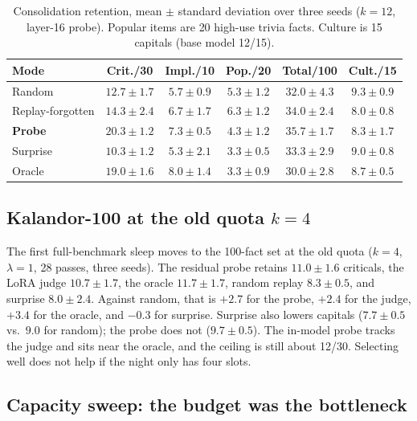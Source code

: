\documentclass[11pt,a4paper]{article}
\begin{document}
\begin{table}[t]
\centering
\caption{Consolidation retention, mean $\pm$ standard deviation over three seeds ($k{=}12$, layer-16 probe). Popular items are 20 high-use trivia facts. Culture is 15 capitals (base model 12/15).}
\label{tab:e5b}
\small
\begin{tabular}{lccccc}
\toprule
Mode & Crit./30 & Impl./10 & Pop./20 & Total/100 & Cult./15 \\
\midrule
Random & $12.7{\pm}1.7$ & $5.7{\pm}0.9$ & $5.3{\pm}1.2$ & $32.0{\pm}4.3$ & $9.3{\pm}0.9$ \\
Replay-forgotten & $14.3{\pm}2.4$ & $6.7{\pm}1.7$ & $6.3{\pm}1.2$ & $34.0{\pm}2.4$ & $8.0{\pm}0.8$ \\
\textbf{Probe} & $\mathbf{20.3{\pm}1.2}$ & $7.3{\pm}0.5$ & $4.3{\pm}1.2$ & $35.7{\pm}1.7$ & $8.3{\pm}1.7$ \\
Surprise & $10.3{\pm}1.2$ & $5.3{\pm}2.1$ & $3.3{\pm}0.5$ & $33.3{\pm}2.9$ & $9.0{\pm}0.8$ \\
Oracle & $19.0{\pm}1.6$ & $8.0{\pm}1.4$ & $3.3{\pm}0.9$ & $30.0{\pm}2.8$ & $8.7{\pm}0.5$ \\
\bottomrule
\end{tabular}
\end{table}

\subsection{Kalandor-100 at the old quota \texorpdfstring{$k{=}4$}{k=4}}
\label{sec:e3}

The first full-benchmark sleep moves to the 100-fact set at the old quota ($k{=}4$, $\lambda{=}1$, 28 passes, three seeds).
The residual probe retains $11.0{\pm}1.6$ criticals, the LoRA judge $10.7{\pm}1.7$, the oracle $11.7{\pm}1.7$, random replay $8.3{\pm}0.5$, and surprise $8.0{\pm}2.4$.
Against random, that is $+2.7$ for the probe, $+2.4$ for the judge, $+3.4$ for the oracle, and $-0.3$ for surprise.
Surprise also lowers capitals ($7.7{\pm}0.5$ vs.\ $9.0$ for random); the probe does not ($9.7{\pm}0.5$).
The in-model probe tracks the judge and sits near the oracle, and the ceiling is still about 12/30.
Selecting well does not help if the night only has four slots.

\subsection{Capacity sweep: the budget was the bottleneck}
\label{sec:e5a}
\end{document}
